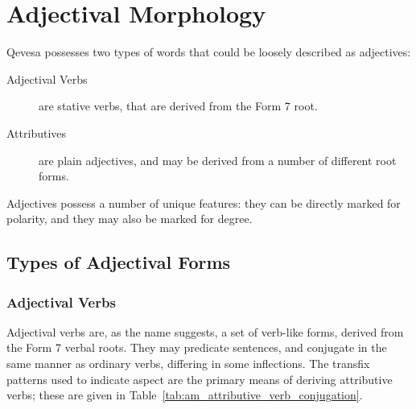 \documentclass[grammar]{subfiles}
\begin{document}
  \chapter{Adjectival Morphology}
  \label{ch:adjectival-morphology}

  Qevesa possesses two types of words that could be loosely described as adjectives:

  \begin{description}
    \item[Adjectival Verbs] are stative verbs, that are derived from the Form 7 root.
    \item[Attributives] are plain adjectives, and may be derived from a number of different root forms.
  \end{description}

  Adjectives possess a number of unique features: they can be directly marked for polarity, and they may also be marked for degree.


  \section{Types of Adjectival Forms}
  \label{sec:am_adjectival_forms}

  \subsection{Adjectival Verbs}
  \label{ssec:am_adjectival_verbs}

  Adjectival verbs are, as the name suggests, a set of verb-like forms, derived from the Form 7 verbal roots. 
  They may predicate sentences, and conjugate in the same manner as ordinary verbs, differing in some inflections.  %
  The transfix patterns used to indicate aspect are the primary means of deriving attributive verbs; these are given in Table~\ref{tab:am_attributive_verb_conjugation}.
\end{document}
